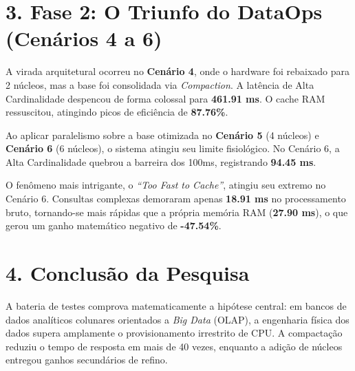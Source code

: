 \documentclass[12pt, a4paper]{article}
\begin{document}
\section*{3. Fase 2: O Triunfo do DataOps (Cenários 4 a 6)}
A virada arquitetural ocorreu no \textbf{Cenário 4}, onde o hardware foi rebaixado para 2 núcleos, mas a base foi consolidada via \textit{Compaction}. A latência de Alta Cardinalidade despencou de forma colossal para \textbf{461.91 ms}. O cache RAM ressuscitou, atingindo picos de eficiência de \textbf{87.76\%}.

Ao aplicar paralelismo sobre a base otimizada no \textbf{Cenário 5} (4 núcleos) e \textbf{Cenário 6} (6 núcleos), o sistema atingiu seu limite fisiológico. No Cenário 6, a Alta Cardinalidade quebrou a barreira dos 100ms, registrando \textbf{94.45 ms}. 

O fenômeno mais intrigante, o \textit{``Too Fast to Cache''}, atingiu seu extremo no Cenário 6. Consultas complexas demoraram apenas \textbf{18.91 ms} no processamento bruto, tornando-se mais rápidas que a própria memória RAM (\textbf{27.90 ms}), o que gerou um ganho matemático negativo de \textbf{-47.54\%}.

\section*{4. Conclusão da Pesquisa}
A bateria de testes comprova matematicamente a hipótese central: em bancos de dados analíticos colunares orientados a \textit{Big Data} (OLAP), a engenharia física dos dados supera amplamente o provisionamento irrestrito de CPU. A compactação reduziu o tempo de resposta em mais de 40 vezes, enquanto a adição de núcleos entregou ganhos secundários de refino.
\end{document}
